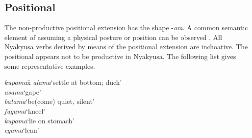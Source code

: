 \subsection{Positional} \label{Positional}
The non-productive positional extension has the shape -\textit{am}. A common semantic element of assuming a physical posture or position can be observed \citep[75]{SchadebergT2003a}. All Nyakyusa verbs derived by means of the positional extension are inchoative. The positional appears not to be productive in Nyakyusa. The following list gives some representative examples.
\begin{exe}
\ex
\begin{tabbing}
\textit{kupama}x\=\kill
\textit{alama}\>`settle at bottom; duck'\\
\textit{asama}\>`gape'\\
\textit{batama}\>`be(come) quiet, silent'\\
\textit{fugama}\>`kneel'\\
\textit{kupama}\>`lie on stomach'\\
\textit{egama}\>`lean'
\end{tabbing}
\end{exe}


